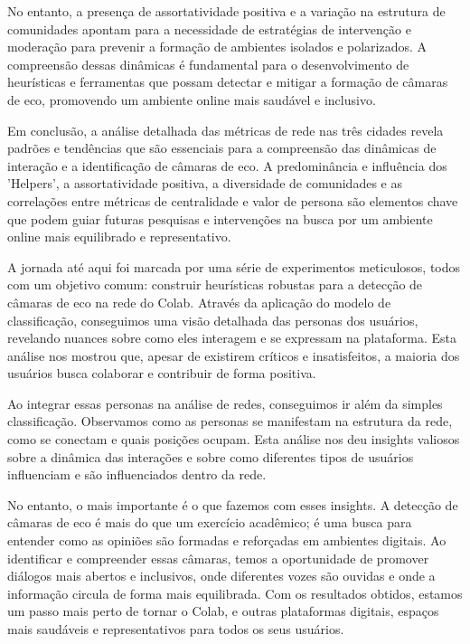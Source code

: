 No entanto, a presença de assortatividade positiva e a variação na estrutura de comunidades apontam para a necessidade de estratégias de intervenção e moderação para prevenir a formação de ambientes isolados e polarizados. A compreensão dessas dinâmicas é fundamental para o desenvolvimento de heurísticas e ferramentas que possam detectar e mitigar a formação de câmaras de eco, promovendo um ambiente online mais saudável e inclusivo.

Em conclusão, a análise detalhada das métricas de rede nas três cidades revela padrões e tendências que são essenciais para a compreensão das dinâmicas de interação e a identificação de câmaras de eco. A predominância e influência dos 'Helpers', a assortatividade positiva, a diversidade de comunidades e as correlações entre métricas de centralidade e valor de persona são elementos chave que podem guiar futuras pesquisas e intervenções na busca por um ambiente online mais equilibrado e representativo.

A jornada até aqui foi marcada por uma série de experimentos meticulosos, todos com um objetivo comum: construir heurísticas robustas para a detecção de câmaras de eco na rede do Colab. Através da aplicação do modelo de classificação, conseguimos uma visão detalhada das personas dos usuários, revelando nuances sobre como eles interagem e se expressam na plataforma. Esta análise nos mostrou que, apesar de existirem críticos e insatisfeitos, a maioria dos usuários busca colaborar e contribuir de forma positiva.

Ao integrar essas personas na análise de redes, conseguimos ir além da simples classificação. Observamos como as personas se manifestam na estrutura da rede, como se conectam e quais posições ocupam. Esta análise nos deu insights valiosos sobre a dinâmica das interações e sobre como diferentes tipos de usuários influenciam e são influenciados dentro da rede.

No entanto, o mais importante é o que fazemos com esses insights. A detecção de câmaras de eco é mais do que um exercício acadêmico; é uma busca para entender como as opiniões são formadas e reforçadas em ambientes digitais. Ao identificar e compreender essas câmaras, temos a oportunidade de promover diálogos mais abertos e inclusivos, onde diferentes vozes são ouvidas e onde a informação circula de forma mais equilibrada. Com os resultados obtidos, estamos um passo mais perto de tornar o Colab, e outras plataformas digitais, espaços mais saudáveis e representativos para todos os seus usuários.

